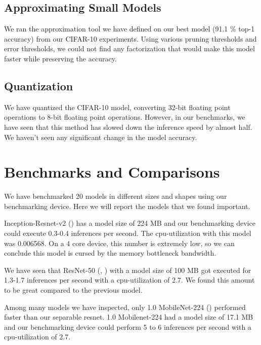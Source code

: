 \subsection{Approximating Small Models}
\label{sec:approximating_small_models}
We ran the approximation tool we have defined on our best model (91.1 \% top-1 accuracy) from our CIFAR-10 experiments. Using various pruning thresholds and error thresholds, we could not find any factorization that would make this model faster while preserving the accuracy.

\subsection{Quantization}
\label{sec:quantizing_small_models}
We have quantized the CIFAR-10 model, converting 32-bit floating point operations to 8-bit floating point operations. However, in our benchmarks, we have seen that this method has slowed down the inference speed by almost half. We haven't seen any significant change in the model accuracy.

\iffalse
\section{Benchmarks and Comparisons}
We have benchmarked 20 models in different sizes and shapes using our benchmarking device. Here we will report the models that we found important.

Inception-Resnet-v2 (\cite{DBLP:journals/corr/SzegedyIV16}) has a model size of 224 MB and our benchmarking device could execute 0.3-0.4 inferences per second. The cpu-utilization with this model was 0.006568. On a 4 core device, this number is extremely low, so we can conclude this model is cursed by the memory bottleneck bandwidth. 

We have seen that ResNet-50 (\cite{He:2015aa}, \cite{he2016identity}) with a model size of 100 MB got executed for 1.3-1.7 inferences per second with a cpu-utilization of 2.7. We found this amount to be great compared to the previous model.  

Among many models we have inspected, only 1.0 MobileNet-224 (\cite{howard2017mobilenets}) performed faster than our separable resnet. 1.0 Mobilenet-224 had a model size of 17.1 MB and our benchmarking device could perform 5 to 6 inferences per second with a cpu-utilization of 2.7. 

